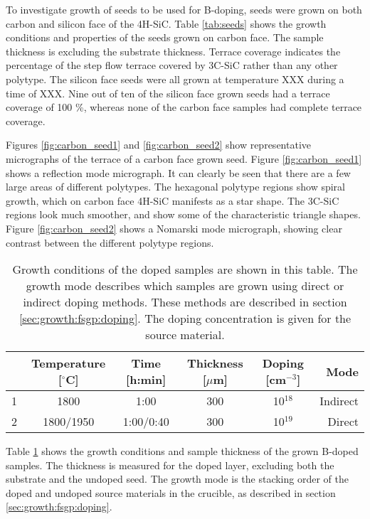 To investigate growth of seeds to be used for B-doping, seeds were grown on both carbon and silicon face of the 4H-SiC. Table \ref{tab:seeds} shows the growth conditions and properties of the seeds grown on carbon face. The sample thickness is excluding the substrate thickness. Terrace coverage indicates the percentage of the step flow terrace covered by 3C-SiC rather than any other polytype. The silicon face seeds were all grown at temperature XXX during a time of XXX. Nine out of ten of the silicon face grown seeds had a terrace coverage of 100 \%, whereas none of the carbon face samples had complete terrace coverage. 

Figures \ref{fig:carbon_seed1} and \ref{fig:carbon_seed2} show representative micrographs of the terrace of a carbon face grown seed. Figure \ref{fig:carbon_seed1} shows a reflection mode micrograph. It can clearly be seen that there are a few large areas of different polytypes. The hexagonal polytype regions show spiral growth, which on carbon face 4H-SiC manifests as a star shape. The 3C-SiC regions look much smoother, and show some of the characteristic triangle shapes. Figure \ref{fig:carbon_seed2} shows a Nomarski mode micrograph, showing clear contrast between the different polytype regions. 

\begin{table}[h]
\caption{Growth conditions of the doped samples are shown in this table. The growth mode describes which samples are grown using direct or indirect doping methods. These methods are described in section \ref{sec:growth:fsgp:doping}. The doping concentration is given for the source material.} 
\label{tab:doped_samples}
\begin{center}
\begin{tabular}{l c c c c r}
  \hline                       
  \hline       
  \vspace{1mm}
   & \small{Temperature [$^\circ$C]} & \small{Time [h:min]} & \small{Thickness [$\mu$m]} & \small{Doping [cm$^{-3}$]} & Mode\\
    \hline
  1 & 1800 & 1:00 & 300 & 10$^{18}$&Indirect\\
  2 & 1800/1950 & 1:00/0:40 & 300 & 10$^{19}$&Direct\\
  \hline  
\end{tabular}
\end{center}
\end{table}

Table \ref{tab:doped_samples} shows the growth conditions and sample thickness of the grown B-doped samples. The thickness is measured for the doped layer, excluding both the substrate and the undoped seed. The growth mode is the stacking order of the doped and undoped source materials in the crucible, as described in section \ref{sec:growth:fsgp:doping}. 

